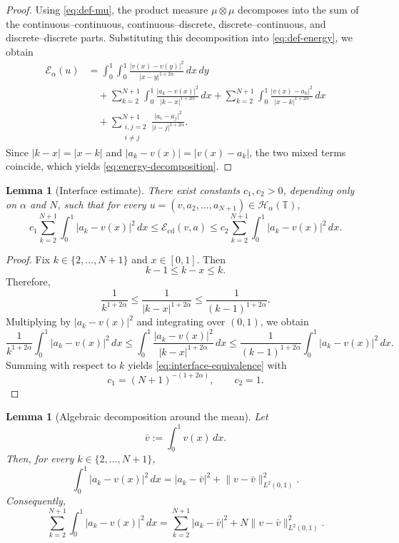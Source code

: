 \documentclass[11pt]{article}
\numberwithin{equation}{section}
\newtheorem{lemma}[theorem]{Lemma}
\theoremstyle{definition}
\newcommand{\T}{\mathbb{T}}
\newcommand{\EE}{\mathcal{E}}
\newcommand{\HH}{\mathcal{H}}
\newcommand{\abs}[1]{\lvert#1\rvert}
\newcommand{\norm}[1]{\lVert#1\rVert}
\newcommand{\cdt}{\mathrm{cd}}
\begin{document}
\begin{proof}
Using \eqref{eq:def-mu}, the product measure $\mu\otimes\mu$ decomposes into the sum of the continuous--continuous, continuous--discrete, discrete--continuous, and discrete--discrete parts. Substituting this decomposition into \eqref{eq:def-energy}, we obtain
\begin{align*}
\EE_\alpha(u)
&=\int_0^1\int_0^1\frac{\abs{v(x)-v(y)}^2}{\abs{x-y}^{1+2\alpha}}\,dx\,dy \\
&\quad +\sum_{k=2}^{N+1}\int_0^1\frac{\abs{a_k-v(x)}^2}{\abs{k-x}^{1+2\alpha}}\,dx
+\sum_{k=2}^{N+1}\int_0^1\frac{\abs{v(x)-a_k}^2}{\abs{x-k}^{1+2\alpha}}\,dx \\
&\quad +\sum_{\substack{i,j=2\\ i\neq j}}^{N+1}\frac{\abs{a_i-a_j}^2}{\abs{i-j}^{1+2\alpha}}.
\end{align*}
Since $\abs{k-x}=\abs{x-k}$ and $\abs{a_k-v(x)}=\abs{v(x)-a_k}$, the two mixed terms coincide, which yields \eqref{eq:energy-decomposition}.
\end{proof}

\begin{lemma}[Interface estimate]\label{lem:interface-estimate}
There exist constants $c_1,c_2>0$, depending only on $\alpha$ and $N$, such that for every $u=(v,a_2,\dots,a_{N+1})\in\HH_\alpha(\T)$,
\begin{equation}\label{eq:interface-equivalence}
c_1\sum_{k=2}^{N+1}\int_0^1\abs{a_k-v(x)}^2\,dx
\le \EE_{\cdt}(v,a)
\le c_2\sum_{k=2}^{N+1}\int_0^1\abs{a_k-v(x)}^2\,dx.
\end{equation}
\end{lemma}

\begin{proof}
Fix $k\in\{2,\dots,N+1\}$ and $x\in[0,1]$. Then
\[
k-1\le k-x\le k.
\]
Therefore,
\[
\frac{1}{k^{1+2\alpha}}\le \frac{1}{\abs{k-x}^{1+2\alpha}}\le \frac{1}{(k-1)^{1+2\alpha}}.
\]
Multiplying by $\abs{a_k-v(x)}^2$ and integrating over $(0,1)$, we obtain
\[
\frac{1}{k^{1+2\alpha}}\int_0^1 \abs{a_k-v(x)}^2\,dx
\le
\int_0^1 \frac{\abs{a_k-v(x)}^2}{\abs{k-x}^{1+2\alpha}}\,dx
\le
\frac{1}{(k-1)^{1+2\alpha}}\int_0^1 \abs{a_k-v(x)}^2\,dx.
\]
Summing with respect to $k$ yields \eqref{eq:interface-equivalence} with
\[
c_1=(N+1)^{-(1+2\alpha)},
\qquad
c_2=1.
\]
\end{proof}

\begin{lemma}[Algebraic decomposition around the mean]\label{lem:mean-decomposition}
Let
\[
\bar v:=\int_0^1 v(x)\,dx.
\]
Then, for every $k\in\{2,\dots,N+1\}$,
\begin{equation}\label{eq:single-mean-decomposition}
\int_0^1 \abs{a_k-v(x)}^2\,dx
=\abs{a_k-\bar v}^2+\norm{v-\bar v}_{L^2(0,1)}^2.
\end{equation}
Consequently,
\begin{equation}\label{eq:sum-mean-decomposition}
\sum_{k=2}^{N+1}\int_0^1 \abs{a_k-v(x)}^2\,dx
=
\sum_{k=2}^{N+1}\abs{a_k-\bar v}^2
+N\norm{v-\bar v}_{L^2(0,1)}^2.
\end{equation}
\end{lemma}
\end{document}
